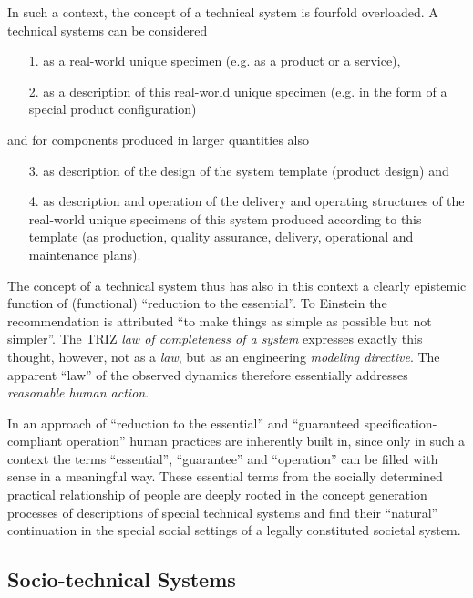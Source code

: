 \documentclass[11pt,a4paper]{article}
\begin{document}
In such a context, the concept of a technical system is fourfold overloaded.
A technical systems can be considered
\begin{itemize}
\item [1.] as a real-world unique specimen (e.g. as a product or a service),
\item [2.] as a description of this real-world unique specimen (e.g. in the
  form of a special product configuration)
\end{itemize}
and for components produced in larger quantities also
\begin{itemize}
\item [3.] as description of the design of the system template (product
  design) and
\item [4.] as description and operation of the delivery and operating
  structures of the real-world unique specimens of this system produced
  according to this template (as production, quality assurance, delivery,
  operational and maintenance plans).
\end{itemize}
The concept of a technical system thus has also in this context a clearly
epistemic function of (functional) ``reduction to the essential''. To Einstein
the recommendation is attributed ``to make things as simple as possible but
not simpler''. The TRIZ \emph{law of completeness of a system} expresses
exactly this thought, however, not as a \emph{law}, but as an engineering
\emph{modeling directive}. The apparent ``law'' of the observed dynamics
therefore essentially addresses \emph{reasonable human action}.

In an approach of ``reduction to the essential'' and ``guaranteed
specification-compliant operation'' human practices are inherently built in,
since only in such a context the terms ``essential'', ``guarantee'' and
``operation'' can be filled with sense in a meaningful way. These essential
terms from the socially determined practical relationship of people are deeply
rooted in the concept generation processes of descriptions of special
technical systems and find their ``natural'' continuation in the special
social settings of a legally constituted societal system.

\subsection{Socio-technical Systems}
\end{document}
